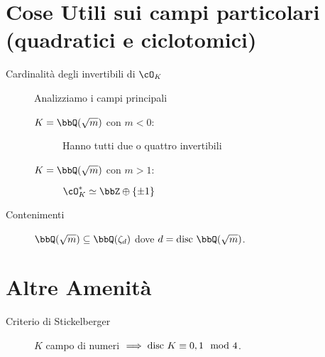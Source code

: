 \documentclass[a4paper, 11pt]{article}
\begin{document}
\section{Cose Utili sui campi particolari (quadratici e ciclotomici)}
\label{sec-3}
\begin{description}
\item[{Cardinalità degli invertibili di $\cO_K$}] Analizziamo i campi principali
\begin{description}
\item[{$K = \bbQ(\sqrt{m})$ con $m < 0$:}] Hanno tutti due o quattro invertibili
\item[{$K = \bbQ(\sqrt{m})$ con $m > 1$:}] $\cO_K^* \simeq \bbZ \oplus \lrg{\pm 1}$
\end{description}
\item[{Contenimenti}] $\bbQ(\sqrt{m}) \subseteq \bbQ(\zeta_d)$ dove $d = \disc \bbQ(\sqrt{m})$.
\end{description}

\section{Altre Amenità}
\label{sec-4}
\begin{description}
\item[{Criterio di Stickelberger}] $K$ campo di numeri $\implies \text{disc } K \equiv 0, 1 \mod 4$.
\end{description}
\end{document}
